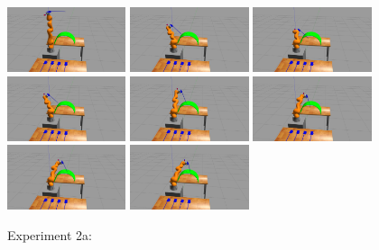 \begin{center}
\begin{figure}[!htb]
\centering
\includegraphics[width=0.31\textwidth]{images/robot_planner2/robot_planner2_1}
\includegraphics[width=0.31\textwidth]{images/robot_planner2/robot_planner2_2}
\includegraphics[width=0.31\textwidth]{images/robot_planner2/robot_planner2_3}\\
\includegraphics[width=0.31\textwidth]{images/robot_planner2/robot_planner2_4}
\includegraphics[width=0.31\textwidth]{images/robot_planner2/robot_planner2_5}
\includegraphics[width=0.31\textwidth]{images/robot_planner2/robot_planner2_6}\\
\includegraphics[width=0.31\textwidth]{images/robot_planner2/robot_planner2_7}
\includegraphics[width=0.31\textwidth]{images/robot_planner2/robot_planner2_8}\\
\caption{Experiment 2a:}
\label{experiment-robot-planner2a}
\end{figure}
\end{center}

